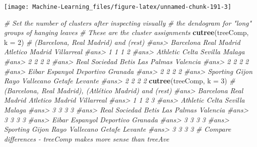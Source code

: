 \documentclass[]{book}
\newenvironment{Shaded}{\begin{snugshade}}{\end{snugshade}}
\newcommand{\KeywordTok}[1]{\textcolor[rgb]{0.13,0.29,0.53}{\textbf{#1}}}
\newcommand{\DataTypeTok}[1]{\textcolor[rgb]{0.13,0.29,0.53}{#1}}
\newcommand{\DecValTok}[1]{\textcolor[rgb]{0.00,0.00,0.81}{#1}}
\newcommand{\CommentTok}[1]{\textcolor[rgb]{0.56,0.35,0.01}{\textit{#1}}}
\newcommand{\NormalTok}[1]{#1}
\theoremstyle{definition}
\theoremstyle{definition}
\theoremstyle{definition}
\theoremstyle{remark}
\begin{document}
\begin{center}\texttt{[image: Machine-Learning\_files/figure-latex/unnamed-chunk-191-3]} \end{center}

\begin{Shaded}
\begin{Highlighting}[]

\CommentTok{# Set the number of clusters after inspecting visually}
\CommentTok{# the dendogram for "long" groups of hanging leaves}
\CommentTok{# These are the cluster assignments}
\KeywordTok{cutree}\NormalTok{(treeComp, }\DataTypeTok{k =} \DecValTok{2}\NormalTok{) }\CommentTok{# (Barcelona, Real Madrid) and (rest)}
\CommentTok{#ans>       Barcelona     Real Madrid Atletico Madrid      Villarreal }
\CommentTok{#ans>               1               1               1               2 }
\CommentTok{#ans>        Athletic           Celta         Sevilla          Malaga }
\CommentTok{#ans>               2               2               2               2 }
\CommentTok{#ans>   Real Sociedad           Betis      Las Palmas        Valencia }
\CommentTok{#ans>               2               2               2               2 }
\CommentTok{#ans>           Eibar        Espanyol       Deportivo         Granada }
\CommentTok{#ans>               2               2               2               2 }
\CommentTok{#ans>  Sporting Gijon  Rayo Vallecano          Getafe         Levante }
\CommentTok{#ans>               2               2               2               2}
\KeywordTok{cutree}\NormalTok{(treeComp, }\DataTypeTok{k =} \DecValTok{3}\NormalTok{) }\CommentTok{# (Barcelona, Real Madrid), (Atlético Madrid) and (rest)}
\CommentTok{#ans>       Barcelona     Real Madrid Atletico Madrid      Villarreal }
\CommentTok{#ans>               1               1               2               3 }
\CommentTok{#ans>        Athletic           Celta         Sevilla          Malaga }
\CommentTok{#ans>               3               3               3               3 }
\CommentTok{#ans>   Real Sociedad           Betis      Las Palmas        Valencia }
\CommentTok{#ans>               3               3               3               3 }
\CommentTok{#ans>           Eibar        Espanyol       Deportivo         Granada }
\CommentTok{#ans>               3               3               3               3 }
\CommentTok{#ans>  Sporting Gijon  Rayo Vallecano          Getafe         Levante }
\CommentTok{#ans>               3               3               3               3}
\CommentTok{# Compare differences - treeComp makes more sense than treeAve}

\end{Highlighting}
\end{Shaded}
\end{document}
